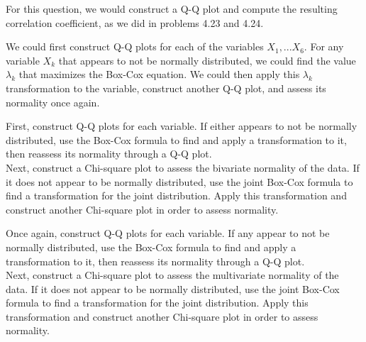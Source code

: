\documentclass[12pt]{article}\usepackage[]{graphicx}\usepackage[]{color}
\newenvironment{problem}[2][Problem]{\begin{trivlist}
\item[\hskip \labelsep {\bfseries #1}\hskip \labelsep {\bfseries #2.}]}{\end{trivlist}}
\begin{document}
For this question, we would construct a Q-Q plot and compute the resulting correlation coefficient, as we did in problems 4.23 and 4.24.


\begin{problem}{4.32}
\end{problem}

We could first construct Q-Q plots for each of the variables $X_1, ... X_6$. For any variable $X_k$ that appears to not be normally distributed, we could find the value $\lambda_k$ that maximizes the Box-Cox equation. We could then apply this $\lambda_k$ transformation to the variable, construct another Q-Q plot, and assess its normality once again.


\begin{problem}{4.34}
\end{problem}

First, construct Q-Q plots for each variable. If either appears to not be normally distributed, use the Box-Cox formula to find and apply a transformation to it, then reassess its normality through a Q-Q plot.\\

Next, construct a Chi-square plot to assess the bivariate normality of the data. If it does not appear to be normally distributed, use the joint Box-Cox formula to find a transformation for the joint distribution. Apply this transformation and construct another Chi-square plot in order to assess normality.


\begin{problem}{4.35}
\end{problem}

Once again, construct Q-Q plots for each variable. If any appear to not be normally distributed, use the Box-Cox formula to find and apply a transformation to it, then reassess its normality through a Q-Q plot.\\

Next, construct a Chi-square plot to assess the multivariate normality of the data. If it does not appear to be normally distributed, use the joint Box-Cox formula to find a transformation for the joint distribution. Apply this transformation and construct another Chi-square plot in order to assess normality.
\end{document}
